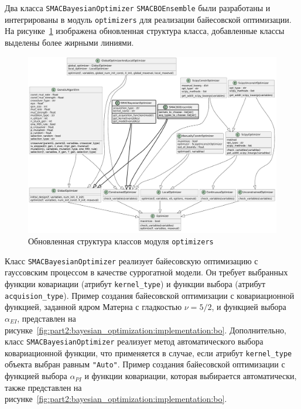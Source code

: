 Два класса \texttt{SMACBayesianOptimizer} \texttt{SMACBOEnsemble} были разработаны и интегрированы в модуль \texttt{optimizers} для реализации байесовской оптимизации.
На рисунке~\ref{fig:part2:bayesian_optimization:implementation:classes} изображена обновленная структура класса, добавленные классы выделены более жирными линиями.

\begin{figure}[ht]
    \centering
    \includegraphics[width=\linewidth]{images/part5/optimizer_classes_short.pdf}
    \caption{Обновленная структура классов модуля \texttt{optimizers}}
    \label{fig:part2:bayesian_optimization:implementation:classes}
\end{figure}

Класс \texttt{SMACBayesianOptimizer} реализует байесовскую оптимизацию с гауссовским процессом в качестве суррогатной модели.
Он требует выбранных функции ковариации (атрибут \texttt{kernel\_type}) и функции выбора (атрибут \texttt{acquision\_type}).
Пример создания байесовской оптимизации с ковариационной функцией, заданной ядром Матерна с гладкостью $\nu= 5/2$, и функцией выбора $\alpha_{EI}$, представлен на рисунке~\ref{fig:part2:bayesian_optimization:implementation:bo}.
Дополнительно, класс \texttt{SMACBayesianOptimizer} реализует метод автоматического выбора ковариационной функции, что применяется в случае, если атрибут \texttt{kernel\_type} объекта выбран равным \texttt{"Auto"}.
Пример создания байесовской оптимизации с функцией выбора $\alpha_{PI}$ и функции ковариации, которая выбирается автоматически, также представлен на рисунке~\ref{fig:part2:bayesian_optimization:implementation:bo}.

